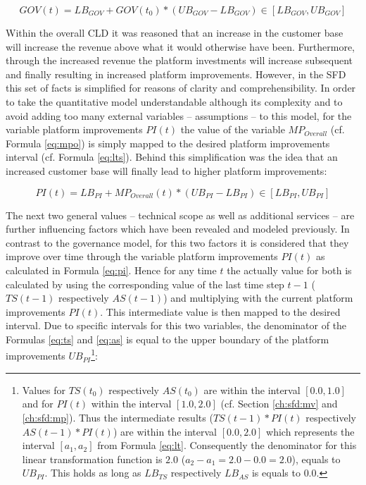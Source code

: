 \begin{equation}\label{eq:gov}
	GOV(t) = LB_{GOV} + GOV(t_0) * (UB_{GOV} - LB_{GOV}) \in [LB_{GOV},UB_{GOV}]
\end{equation}

Within the overall \ac{CLD} it was reasoned that an increase in the customer base will increase the revenue above what it would otherwise have been. Furthermore, through the increased revenue the platform investments will increase subsequent and finally resulting in increased platform improvements. However, in the \ac{SFD} this set of facts is simplified for reasons of clarity and comprehensibility. In order to take the quantitative model understandable although its complexity and to avoid adding too many external variables -- assumptions -- to this model, for the variable  platform improvements $PI(t)$ the value of the variable $MP_{Overall}$ (cf. Formula \ref{eq:mpo}) is simply mapped to the desired platform improvements interval (cf. Formula \ref{eq:lts}). Behind this simplification was the idea that an increased customer base will finally lead to higher platform improvements:

\begin{equation}\label{eq:pi}
	PI(t) = LB_{PI} + MP_{Overall}(t) * (UB_{PI} - LB_{PI}) \in [LB_{PI},UB_{PI}]
\end{equation}

The next two general values -- technical scope as well as additional services -- are further influencing factors which have been revealed and modeled previously. In contrast to the governance model, for this two factors it is considered that they improve over time through the variable platform improvements $PI(t)$ as calculated in Formula \ref{eq:pi}. Hence for any time $t$ the actually value for both is calculated by using the corresponding value of the last time step $t-1$ ($TS(t-1)$ respectively $ AS(t-1)$) and multiplying with the current platform improvements $PI(t)$. This intermediate value is then mapped to the desired interval. Due to specific intervals for this two variables, the denominator of the Formulas \ref{eq:ts} and \ref{eq:as} is equal to the upper boundary of the platform improvements $UB_{PI}$\footnote{Values for $TS(t_0)$ respectively $AS(t_0)$ are within the interval $[0.0,1.0]$ and for $PI(t)$ within the interval $[1.0,2.0]$ (cf. Section \ref{ch:sfd:mv} and \ref{ch:sfd:mp}). Thus the intermediate results ($TS(t-1)*PI(t)$ respectively $AS(t-1) *PI(t)$) are within the interval $[0.0,2.0]$ which represents the interval $[a_1,a_2]$ from Formula \ref{eq:lt}. Consequently the denominator for this linear transformation function is $2.0$ ($a_2 - a_1 = 2.0 - 0.0 = 2.0$), equals to $UB_{PI}$. This holds as long as $LB_{TS}$ respectively $LB_{AS}$ is equals to $0.0$.}:

